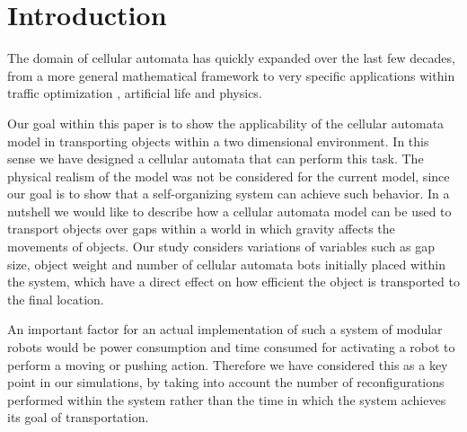 \section{Introduction}
\label{sec:intro}

The domain of cellular automata has quickly expanded over the last few decades, from a more general mathematical framework \cite{Neumann:1966:TSA:1102024} to very specific applications within traffic optimization \cite{ISI:A1995QH06900031,ISI:A1992KF03100005}, artificial life \cite{ISI:A1992JV77700063} and physics.

Our goal within this paper is to show the applicability of the cellular automata model in transporting objects within a two dimensional environment. In this sense we have designed a cellular automata that can perform this task. The physical realism of the model was not be considered for the current model, since our goal is to show that a self-organizing system can achieve such behavior. In a nutshell we would like to describe how a cellular automata model can be used to transport objects over gaps within a world in which gravity affects the movements of objects. Our study considers variations of variables such as gap size, object weight and number of cellular automata bots initially placed within the system, which have a direct effect on how efficient the object is transported to the final location. 

An important factor for an actual implementation of such a system of modular robots would be power consumption and time consumed for activating a robot to perform a moving or pushing action. Therefore we have considered this as a key point in our simulations, by taking into account the number of reconfigurations performed within the system rather than the time in which the system achieves its goal of transportation. 
